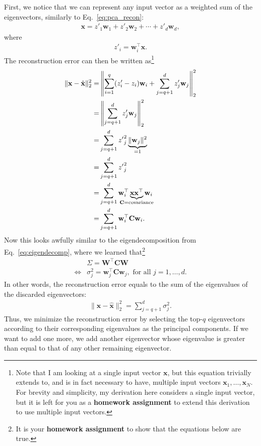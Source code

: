 \documentclass{report}
\newcommand{\vect}[1]{\mathbf{#1}}
\newcommand{\matr}[1]{\mathbf{#1}}
\newcommand{\vx}[0]{\vect{x}}
\newcommand{\vw}[0]{\vect{w}}
\newcommand{\mW}[0]{\matr{W}}
\newcommand{\mC}{\matr{C}}
\begin{document}
First, we notice that we can represent any input vector as a weighted sum of the
eigenvectors, similarly to Eq.~\eqref{eq:pca_recon}:
\begin{align*}
    \vx = z'_1 \vw_1 + z'_2 \vw_2 + \cdots + z'_d \vw_d,
\end{align*}
where 
\begin{align*}
    z'_i = \vw_i^\top \vx.
\end{align*}
The reconstruction error can then be written as\footnote{
    Note that I am looking at a single input vector $\vx$, but this equation
    trivially extends to, and is in fact necessary to have, multiple input
    vectors $\vx_1, \ldots, \vx_N$. For brevity and simplicity, my derivation
    here considers a single input vector, but it is left for you as a {\bf
    homework assignment} to extend this derivation to use multiple input
    vectors.
}
\begin{align*}
    \| \vx - \hat{\vx} \|^2_2 =&
    \left\| \sum_{i=1}^q (z'_i - z_i) \vw_i + \sum_{j=q+1}^d z'_j \vw_j \right\|^2_2 \\
    =& 
    \left\| \sum_{j=q+1}^d z'_j \vw_j \right\|^2_2 \\
    =& 
    \sum_{j=q+1}^d {z'}_j^2 \underbrace{\| \vw_j \|^2}_{=1} \\
    =& 
    \sum_{j=q+1}^d {z'}_j^2 \\
    =&
    \sum_{j=q+1}^d \vw_i^\top \underbrace{\vx \vx^\top}_{
    \mathclap{\mC=\text{covariance}}} \vw_i \\
    =&
    \sum_{j=q+1}^d \vw_i^\top \mC \vw_i.
\end{align*}
Now this looks awfully similar to the eigendecomposition from
Eq.~\eqref{eq:eigendecomp}, where we learned that\footnote{
    It is your {\bf homework assignment} to show that the equations below are
    true.
}
\begin{align*}
    &\Sigma = \mW^\top \mC \mW \\
    \iff&
    \sigma_j^2 = \vw_j^\top \mC \vw_j,\text{ for all }j=1,\ldots,d.
\end{align*}
In other words, the reconstruction error equals to the sum of the eigenvalues of
the discarded eigenvectors:
\begin{align*}
    \| \vx - \hat{\vx} \|^2_2 =
    \sum_{j=q+1}^d \sigma_j^2.
\end{align*}
Thus, we minimize the reconstruction error by selecting the top-$q$ eigenvectors
according to their corresponding eigenvalues as the principal components. If we
want to add one more, we add another eigenvector whose eigenvalue is greater
than equal to that of any other remaining eigenvector.
\end{document}
